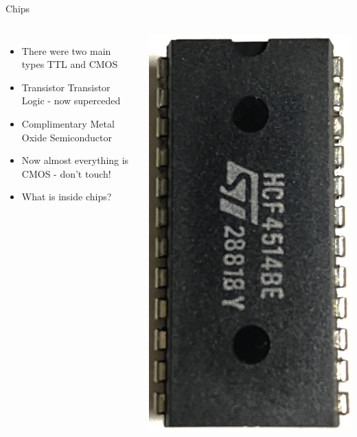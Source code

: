 \documentclass{beamer}
\begin{document}
\begin{frame}{Chips}
  \begin{columns}
    \begin{itemize}
    \item
      There were two main types TTL and CMOS
    \item
      Transistor Transistor Logic - now superceded
    \item
      Complimentary Metal Oxide Semiconductor
    \item
      Now almost everything is CMOS - don't touch!
    \item
      What is inside chips?
    \end{itemize}

    \includegraphics[scale=0.05]{../assets/IC-Picture.eps}
  \end{columns}    
\end{frame}
\end{document}
